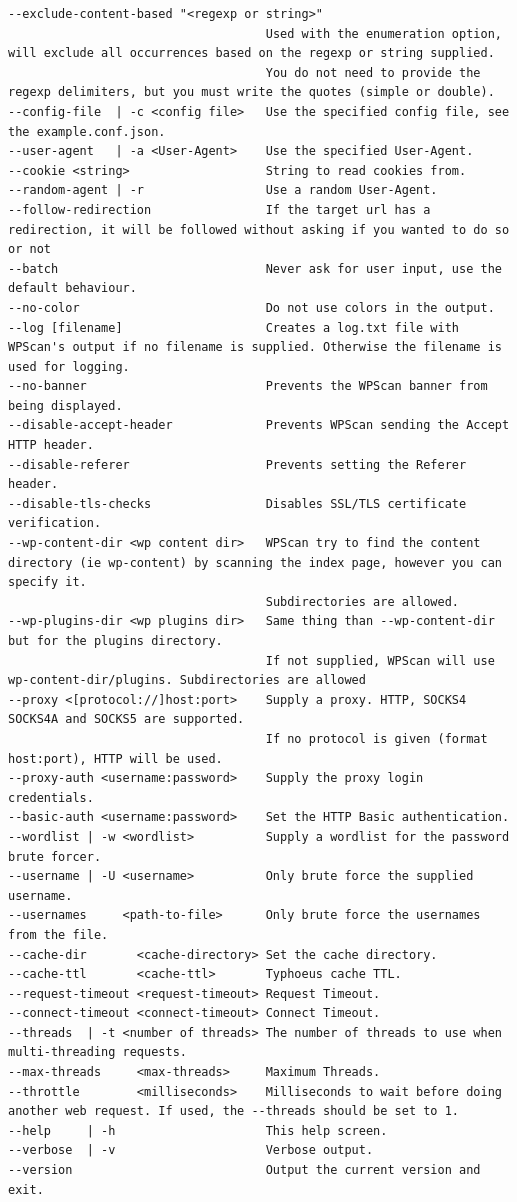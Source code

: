 \documentclass{article}
\begin{document}
\begin{lstlisting}
--exclude-content-based "<regexp or string>"
                                    Used with the enumeration option, will exclude all occurrences based on the regexp or string supplied.
                                    You do not need to provide the regexp delimiters, but you must write the quotes (simple or double).
--config-file  | -c <config file>   Use the specified config file, see the example.conf.json.
--user-agent   | -a <User-Agent>    Use the specified User-Agent.
--cookie <string>                   String to read cookies from.
--random-agent | -r                 Use a random User-Agent.
--follow-redirection                If the target url has a redirection, it will be followed without asking if you wanted to do so or not
--batch                             Never ask for user input, use the default behaviour.
--no-color                          Do not use colors in the output.
--log [filename]                    Creates a log.txt file with WPScan's output if no filename is supplied. Otherwise the filename is used for logging.
--no-banner                         Prevents the WPScan banner from being displayed.
--disable-accept-header             Prevents WPScan sending the Accept HTTP header.
--disable-referer                   Prevents setting the Referer header.
--disable-tls-checks                Disables SSL/TLS certificate verification.
--wp-content-dir <wp content dir>   WPScan try to find the content directory (ie wp-content) by scanning the index page, however you can specify it.
                                    Subdirectories are allowed.
--wp-plugins-dir <wp plugins dir>   Same thing than --wp-content-dir but for the plugins directory.
                                    If not supplied, WPScan will use wp-content-dir/plugins. Subdirectories are allowed
--proxy <[protocol://]host:port>    Supply a proxy. HTTP, SOCKS4 SOCKS4A and SOCKS5 are supported.
                                    If no protocol is given (format host:port), HTTP will be used.
--proxy-auth <username:password>    Supply the proxy login credentials.
--basic-auth <username:password>    Set the HTTP Basic authentication.
--wordlist | -w <wordlist>          Supply a wordlist for the password brute forcer.
--username | -U <username>          Only brute force the supplied username.
--usernames     <path-to-file>      Only brute force the usernames from the file.
--cache-dir       <cache-directory> Set the cache directory.
--cache-ttl       <cache-ttl>       Typhoeus cache TTL.
--request-timeout <request-timeout> Request Timeout.
--connect-timeout <connect-timeout> Connect Timeout.
--threads  | -t <number of threads> The number of threads to use when multi-threading requests.
--max-threads     <max-threads>     Maximum Threads.
--throttle        <milliseconds>    Milliseconds to wait before doing another web request. If used, the --threads should be set to 1.
--help     | -h                     This help screen.
--verbose  | -v                     Verbose output.
--version                           Output the current version and exit.



\end{lstlisting}
\end{document}
